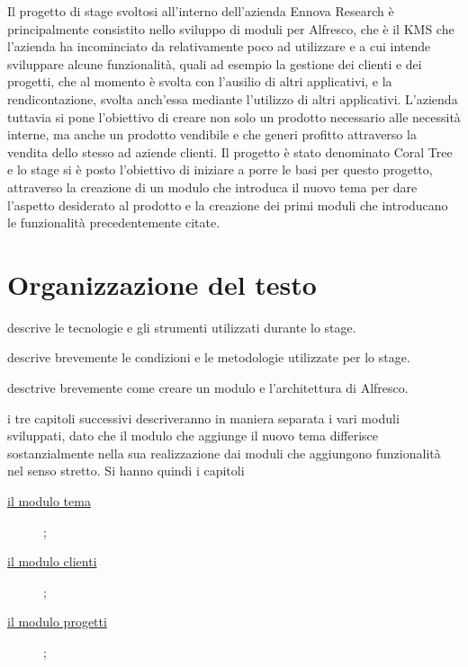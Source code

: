 Il progetto di stage svoltosi all’interno dell’azienda Ennova Research è principalmente consistito nello sviluppo di moduli per Alfresco, che è il \gls{KMS} che l'azienda ha incominciato da relativamente poco ad utilizzare e a cui intende sviluppare alcune funzionalità, quali ad esempio la gestione dei clienti e dei progetti, che al momento è svolta con l'ausilio di altri applicativi, e la rendicontazione, svolta anch'essa mediante l'utilizzo di altri applicativi.
L'azienda tuttavia si pone l'obiettivo di creare non solo un prodotto necessario alle necessità interne, ma anche un prodotto vendibile e che generi profitto attraverso la vendita dello stesso ad aziende clienti. Il progetto è stato denominato Coral Tree e lo stage si è posto l'obiettivo di iniziare a porre le basi per questo progetto, attraverso la creazione di un modulo che introduca il nuovo tema per dare l'aspetto desiderato al prodotto e la creazione dei primi moduli che introducano le funzionalità precedentemente citate.

\section{Organizzazione del testo}
\begin{description}
    \item[{\hyperref[cap:tecnologie-strumenti]{Il secondo capitolo}}] descrive le tecnologie e gli strumenti utilizzati durante lo stage.    
    \item[{\hyperref[cap:descrizione-stage]{Il terzo capitolo}}] descrive brevemente le condizioni e le metodologie utilizzate per lo stage.
		 \item[{\hyperref[cap:architettura]{Il quarto  capitolo}}] desctrive brevemente come creare un modulo e l'architettura di Alfresco.
		\item i tre capitoli successivi descriveranno in maniera separata i vari moduli sviluppati, dato che il modulo che aggiunge il nuovo tema differisce
		sostanzialmente nella sua realizzazione dai moduli che aggiungono funzionalità nel senso stretto.
		Si hanno quindi i capitoli
		\begin{description}
		\item[{\hyperref[cap:modulo-tema]{il modulo tema}}];
		\item[{\hyperref[cap:modulo-clienti]{il modulo clienti}}];
		\item[{\hyperref[cap:modulo-progetti]{ il modulo progetti}}];
		\end{description}
\end{description}